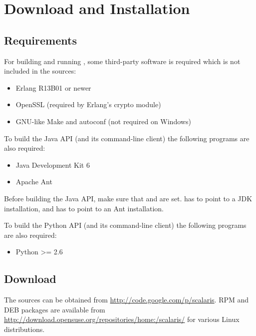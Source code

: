 \chapter{Download and Installation}
\label{chapter.downloadinstall}

\section{Requirements}
\label{sec.requirements}

For building and running \scalaris{}, some third-party software is
required which is not included in the \scalaris{} sources:

\begin{itemize}
\setlength{\itemsep}{0pt}
\setlength{\parskip}{0pt}
\item Erlang R13B01 or newer
\item OpenSSL (required by Erlang's crypto module)
\item GNU-like Make and autoconf (not required on Windows)
\end{itemize}

To build the Java API (and its command-line client) the following
programs are also required:

\begin{itemize}
\setlength{\itemsep}{0pt}
\setlength{\parskip}{0pt}
\item Java Development Kit 6
\item Apache Ant
\end{itemize}

Before building the Java API, make sure that  and
 are set.  has to point to a JDK
installation, and  has to point to an Ant installation.

To build the Python API (and its command-line client) the following
programs are also required:

\begin{itemize}
\setlength{\itemsep}{0pt}
\setlength{\parskip}{0pt}
\item Python >= 2.6
\end{itemize}

\section{Download}

The sources can be obtained from
\url{http://code.google.com/p/scalaris}. RPM and DEB packages are available
from \url{http://download.opensuse.org/repositories/home:/scalaris/} for
various Linux distributions.

